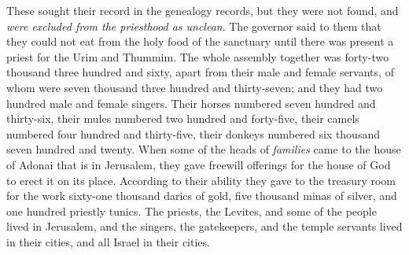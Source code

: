 \begin{biblechapter}
\verse These sought their record in the genealogy records, but they were not found, and \textit{were excluded from the priesthood as unclean}.
\verse The governor said to them that they could not eat from the holy food of the sanctuary until there was present a priest for the Urim and Thummim.
\verse The whole assembly together was forty-two thousand three hundred and sixty,
\verse apart from their male and female servants, of whom were seven thousand three hundred and thirty-seven; and they had two hundred male and female singers.
\verse Their horses numbered seven hundred and thirty-six, their mules numbered two hundred and forty-five,
\verse their camels numbered four hundred and thirty-five, their donkeys numbered six thousand seven hundred and twenty.
 When some of the heads of \textit{families} came to the house of Adonai that is in Jerusalem, they gave freewill offerings for the house of God to erect it on its place.
\verse According to their ability they gave to the treasury room for the work sixty-one thousand darics of gold, five thousand minas of silver, and one hundred priestly tunics.
\verse The priests, the Levites, and some of the people lived in Jerusalem, and the singers, the gatekeepers, and the temple servants lived in their cities, and all Israel in their cities.
\end{biblechapter}

